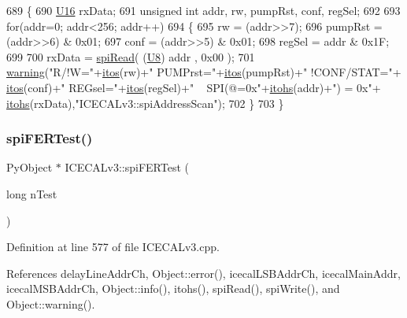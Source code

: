 \begin{DoxyCode}
689 \{
690     \hyperlink{ICECALv3_8h_adf928e51a60dba0df29d615401cc55a8}{U16} rxData;
691     \textcolor{keywordtype}{unsigned} \textcolor{keywordtype}{int} addr, rw, pumpRst, conf, regSel;
692 
693     \textcolor{keywordflow}{for}(addr=0; addr<256; addr++)
694     \{
695         rw      = (addr>>7);
696         pumpRst = (addr>>6) & 0x01;
697         conf    = (addr>>5) & 0x01;
698         regSel  = addr & 0x1F;
699 
700         rxData = \hyperlink{classICECALv3_aced41ce20a0853d6248b8df88412e57a}{spiRead}( (\hyperlink{ICECALv3_8h_a3cb25ca6f51f003950f9625ff05536fc}{U8}) addr , 0x00 );
701         \hyperlink{classObject_a65cd4fda577711660821fd2cd5a3b4c9}{warning}(\textcolor{stringliteral}{"R/!W="}+\hyperlink{Tools_8h_af330027dbdafb9a30768b3613c553e60}{itos}(rw)+\textcolor{stringliteral}{" PUMPrst="}+\hyperlink{Tools_8h_af330027dbdafb9a30768b3613c553e60}{itos}(pumpRst)+\textcolor{stringliteral}{" !CONF/STAT="}+
      \hyperlink{Tools_8h_af330027dbdafb9a30768b3613c553e60}{itos}(conf)+\textcolor{stringliteral}{" REGsel="}+\hyperlink{Tools_8h_af330027dbdafb9a30768b3613c553e60}{itos}(regSel)+\textcolor{stringliteral}{" ~ SPI(@=0x"}+\hyperlink{classICECALv3_a04b02e583f191bfce34d05132cd23834}{itohs}(addr)+\textcolor{stringliteral}{") = 0x"}+
      \hyperlink{classICECALv3_a04b02e583f191bfce34d05132cd23834}{itohs}(rxData),\textcolor{stringliteral}{"ICECALv3::spiAddressScan"});
702     \}
703 \}
\end{DoxyCode}
\mbox{\label{classICECALv3_a8639cf6a44cba85b53128b5e1dc21e15}} 
\subsubsection{\texorpdfstring{spi\+F\+E\+R\+Test()}{spiFERTest()}}
{\footnotesize\ttfamily Py\+Object $\ast$ I\+C\+E\+C\+A\+Lv3\+::spi\+F\+E\+R\+Test (\begin{DoxyParamCaption}\item[{long}]{n\+Test }\end{DoxyParamCaption})}



Definition at line 577 of file I\+C\+E\+C\+A\+Lv3.\+cpp.



References delay\+Line\+Addr\+Ch, Object\+::error(), icecal\+L\+S\+B\+Addr\+Ch, icecal\+Main\+Addr, icecal\+M\+S\+B\+Addr\+Ch, Object\+::info(), itohs(), spi\+Read(), spi\+Write(), and Object\+::warning().




